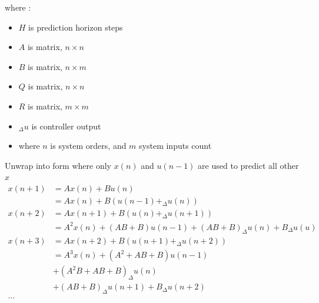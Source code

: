 \documentclass[12pt,twoside,onecolumn,openany,extrafontsizes,dvipsnames]{memoir}
\begin{document}
        where : 
        \begin{itemize}
          \item $H$ is prediction horizon steps
          \item $A$ is matrix, $n \times n$
          \item $B$ is matrix, $n \times m$
          \item $Q$ is matrix, $n \times n$
          \item $R$ is matrix, $m \times m$
          \item $_\Delta u$ is controller output
          \item where $n$ is system orders, and $m$ system inputs count
        \end{itemize}

        Unwrap into form where only $x(n)$ and $u(n-1)$ are used to predict all other $x$
        \begin{align*}
            x(n+1)&= Ax(n) + Bu(n) \\
                &= Ax(n) + B(u(n-1) + _\Delta u(n)) \\
            x(n+2)&= Ax(n+1) + B(u(n) + _\Delta u(n+1)) \\
                &= A^2x(n) + (AB + B)u(n-1) + (AB+B)_\Delta u(n) + B_\Delta u(u) \\
            x(n+3)&= Ax(n+2) + B(u(n+1) + _\Delta u(n+2)) \\
                &= A^3x(n) + (A^2 + AB + B)u(n-1) \\
                & + (A^2B + AB + B)_\Delta u(n) \\
                & + (AB + B)_\Delta u(n+1) + B_\Delta u(n+2) \\
            ... 
        \end{align*}  
\end{document}
